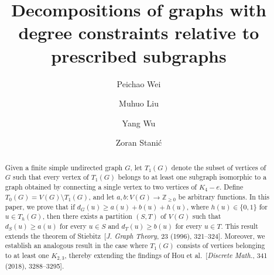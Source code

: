 \documentclass[11p]{elsarticle}
\theoremstyle{definition}
\begin{document}
	
		\begin{frontmatter}
	
	\title{\textbf{Decompositions of graphs with degree constraints relative to prescribed subgraphs}}
	
	\author{Peichao Wei}
	\address{Institute of Mathematics, School of Mathematical Sciences, Nanjing Normal University, 
		Nanjing, 210023, China}
	
	\author{Muhuo Liu}
	\address{Department of Mathematics,  South China     Agricultural  University, Guangzhou, 510642, China}
	
	\author{Yang Wu}
	\address{School of Computer Science and Engineering,   Macau University of Science and Technology, Macau, China}
	
	\author{Zoran Stani\' c}
		\address{Faculty of Mathematics, University of Belgrade,
			Studentski trg 16, 11 000 Belgrade, Serbia}
	
	
	
	
%	
%		
	
	\begin{abstract}
Given a finite simple undirected graph $G$, let $T_1(G)$ denote the  subset of vertices of $G$ such that every vertex of $T_1(G)$ belongs to at least one subgraph isomorphic to a graph obtained by connecting a single vertex to two vertices of $K_4 - e$. Define  $T_0(G) = V(G) \setminus T_1(G)$, and let $a,b \colon V(G) \longrightarrow \mathbb{Z}_{\ge 0}$ be arbitrary functions. In this paper, we prove that if $d_G(u) \ge a(u) + b(u) + h(u)$, where $h(u) \in \{0,1\}$ for $u \in T_h(G)$, then there exists a partition $(S, T)$ of $V(G)$ such that $d_{S}(u) \ge a(u)$ for every $u \in S$ and $d_{T}(u) \ge b(u)$ for every $u \in T$. This result extends the theorem of Stiebitz~[\textit{J. Graph Theory}, 23  (1996), 321--324]. Moreover, we establish an analogous result in the case where $T_1(G)$ consists of vertices belonging to at least one $K_{2,3}$, thereby extending the findings of Hou et al.~[\textit{Discrete Math.}, 341 (2018), 3288--3295].
\end{abstract}



\end{frontmatter}
\end{document}
